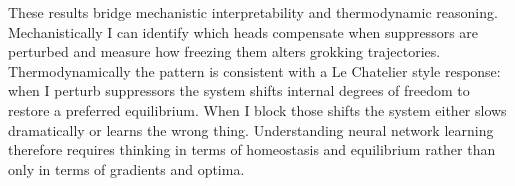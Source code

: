 These results bridge mechanistic interpretability and thermodynamic reasoning. Mechanistically I can identify which heads compensate when suppressors are perturbed and measure how freezing them alters grokking trajectories. Thermodynamically the pattern is consistent with a Le Chatelier style response: when I perturb suppressors the system shifts internal degrees of freedom to restore a preferred equilibrium. When I block those shifts the system either slows dramatically or learns the wrong thing. Understanding neural network learning therefore requires thinking in terms of homeostasis and equilibrium rather than only in terms of gradients and optima.
